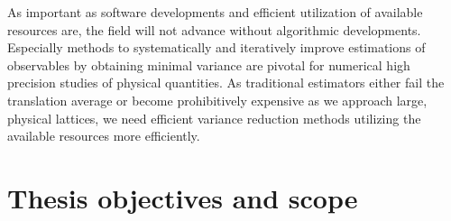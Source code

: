 
As important as software developments and efficient utilization of available resources are, the field will not advance without algorithmic developments.
Especially methods to systematically and iteratively improve estimations of observables by obtaining minimal variance are pivotal for numerical high precision studies of physical quantities.
As traditional estimators either fail the translation average or become prohibitively expensive as we approach large, physical lattices, we need efficient variance reduction methods utilizing the available resources more efficiently.





\section{Thesis objectives and scope}
\label{sec:intro:objectives}

